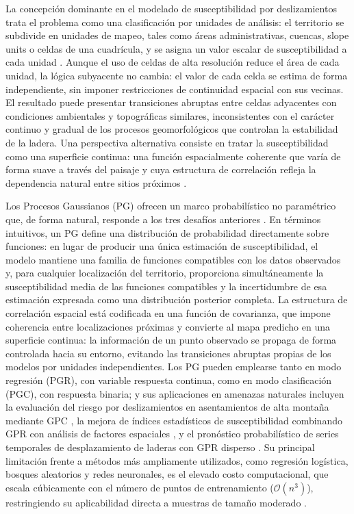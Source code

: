 \documentclass[12pt, a4paper]{article}
\begin{document}
La concepción dominante en el modelado de susceptibilidad por deslizamientos trata el problema como una clasificación por unidades de análisis: el
territorio se subdivide en unidades de mapeo, tales como áreas administrativas, cuencas, slope units o celdas de una
cuadrícula, y se asigna un valor escalar de susceptibilidad a cada unidad \citep{Guzzetti2005, Reichenbach2018}. Aunque el uso
de celdas de alta resolución reduce el área de cada unidad, la lógica subyacente no cambia: el valor de cada celda se estima de
forma independiente, sin imponer restricciones de continuidad espacial con sus vecinas. El resultado puede presentar transiciones
abruptas entre celdas adyacentes con condiciones ambientales y topográficas similares, inconsistentes con el carácter continuo y
gradual de los procesos geomorfológicos que controlan la estabilidad de la ladera. Una perspectiva alternativa consiste en tratar la
susceptibilidad como una superficie continua: una función espacialmente coherente que varía de forma suave a través del
paisaje y cuya estructura de correlación refleja la dependencia natural entre sitios próximos \citep{Lombardo2020}.

Los Procesos Gaussianos (PG) ofrecen un marco probabilístico no paramétrico que, de forma natural, responde a los tres desafíos
anteriores \citep{Rasmussen2006}. En términos intuitivos, un PG define una distribución de probabilidad directamente sobre
funciones: en lugar de producir una única estimación de susceptibilidad, el modelo mantiene una familia de funciones compatibles
con los datos observados y, para cualquier localización del territorio, proporciona simultáneamente la susceptibilidad media de las 
funciones compatibles y la incertidumbre de esa estimación expresada como una distribución posterior completa. La estructura de 
correlación espacial está codificada en una función de covarianza, que impone coherencia entre localizaciones próximas y convierte al mapa
predicho en una superficie continua: la información de un punto observado se propaga de forma controlada hacia su entorno,
evitando las transiciones abruptas propias de los modelos por unidades independientes. Los PG pueden emplearse tanto en modo
regresión (PGR), con variable respuesta continua, como en modo clasificación (PGC), con respuesta binaria; y sus aplicaciones
en amenazas naturales incluyen la evaluación del riesgo por deslizamientos en asentamientos de alta montaña mediante GPC
\citep{Gao2021}, la mejora de índices estadísticos de susceptibilidad combinando GPR con análisis de factores espaciales
\citep{Cheng2022}, y el pronóstico probabilístico de series temporales de desplazamiento de laderas con GPR disperso
\citep{Yang2022}. Su principal limitación frente a métodos más ampliamente utilizados, como regresión logística,
bosques aleatorios y redes neuronales, es el elevado costo computacional, que escala cúbicamente con el número de puntos de
entrenamiento ($\mathcal{O}(n^3)$), restringiendo su aplicabilidad directa a muestras de tamaño moderado \citep{Rasmussen2006}.
\end{document}
